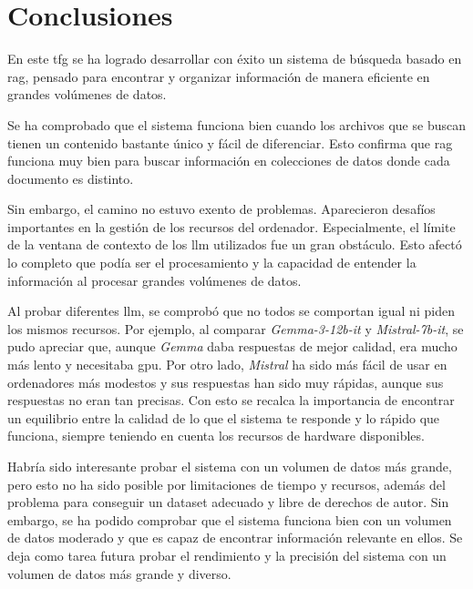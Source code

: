 
\chapter{Conclusiones}
\label{conclusiones}

En este \gls{tfg} se ha logrado desarrollar con éxito un sistema de búsqueda basado en \gls{rag}, pensado para encontrar y organizar información de manera eficiente en grandes volúmenes de datos.

Se ha comprobado que el sistema funciona bien cuando los archivos que se buscan tienen un contenido bastante único y fácil de diferenciar. Esto confirma que \gls{rag} funciona muy bien para buscar información en colecciones de datos donde cada documento es distinto.

Sin embargo, el camino no estuvo exento de problemas. Aparecieron desafíos importantes en la gestión de los recursos del ordenador. Especialmente, el límite de la ventana de contexto de los \gls{llm} utilizados fue un gran obstáculo. Esto afectó lo completo que podía ser el procesamiento y la capacidad de entender la información al procesar grandes volúmenes de datos.

Al probar diferentes \gls{llm}, se comprobó que no todos se comportan igual ni piden los mismos recursos. Por ejemplo, al comparar \textit{Gemma-3-12b-it} y \textit{Mistral-7b-it}, se pudo apreciar que, aunque \textit{Gemma} daba respuestas de mejor calidad, era mucho más lento y necesitaba \gls{gpu}. Por otro lado, \textit{Mistral} ha sido más fácil de usar en ordenadores más modestos y sus respuestas han sido muy rápidas, aunque sus respuestas no eran tan precisas. Con esto se recalca la importancia de encontrar un equilibrio entre la calidad de lo que el sistema te responde y lo rápido que funciona, siempre teniendo en cuenta los recursos de hardware disponibles.

Habría sido interesante probar el sistema con un volumen de datos más grande, pero esto no ha sido posible por limitaciones de tiempo y recursos, además del problema para conseguir un dataset adecuado y libre de derechos de autor. Sin embargo, se ha podido comprobar que el sistema funciona bien con un volumen de datos moderado y que es capaz de encontrar información relevante en ellos. Se deja como tarea futura probar el rendimiento y la precisión del sistema con un volumen de datos más grande y diverso.

